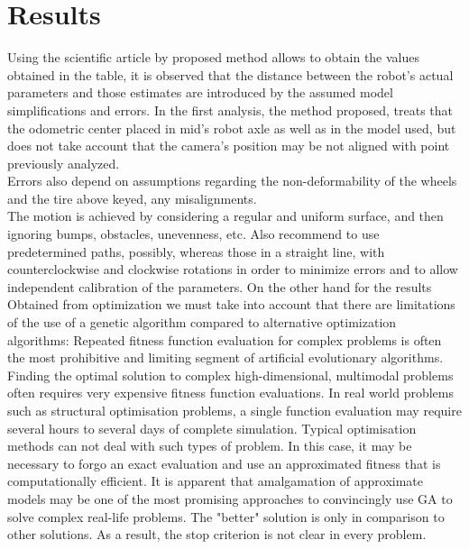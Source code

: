 \section{Results}
Using the scientific article by proposed method allows to obtain the values obtained in the table, it is observed that the distance between the robot’s actual parameters and those estimates are introduced by the assumed model simplifications and errors.
In the first analysis, the method proposed, treats that the odometric center placed in mid’s robot axle as well as in the model used, but does not take account that the camera’s position may be not aligned with point previously analyzed.\\
Errors also depend on assumptions regarding the non-deformability of the wheels and the tire above keyed, any misalignments.\\ 
The motion is achieved by considering a regular and uniform surface, and then ignoring bumps, obstacles, unevenness, etc. 
Also recommend to use predetermined paths, possibly, whereas those in a straight line, with counterclockwise and clockwise rotations in order to minimize errors and to allow independent calibration of the parameters.
On the other hand for the results Obtained from optimization we must take into account that there are limitations of the use of a genetic algorithm compared to alternative optimization algorithms:
Repeated fitness function evaluation for complex problems is often the most prohibitive and limiting segment of artificial evolutionary algorithms. Finding the optimal solution to complex high-dimensional, multimodal problems often requires very expensive fitness function evaluations. In real world problems such as structural optimisation problems, a single function evaluation may require several hours to several days of complete simulation. Typical optimisation methods can not deal with such types of problem. In this case, it may be necessary to forgo an exact evaluation and use an approximated fitness that is computationally efficient. It is apparent that amalgamation of approximate models may be one of the most promising approaches to convincingly use GA to solve complex real-life problems.
The "better" solution is only in comparison to other solutions. As a result, the stop criterion is not clear in every problem.
